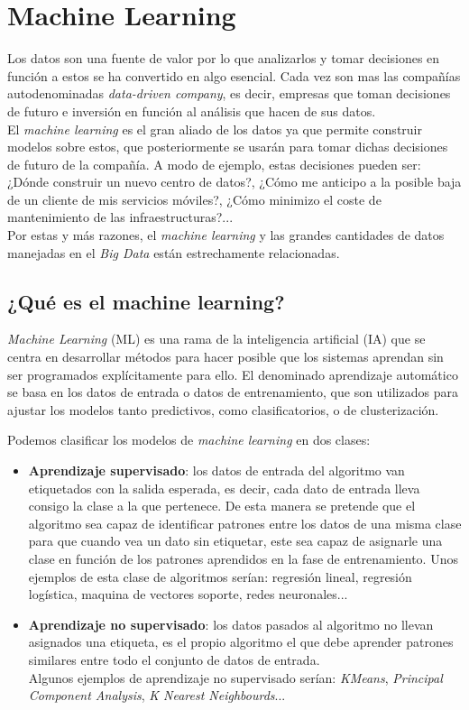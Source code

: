 \chapter{Machine Learning}
Los datos son una fuente de valor por lo que analizarlos y tomar decisiones en función a estos se ha
convertido en algo esencial. Cada vez son mas las compañías autodenominadas 
\textit{data-driven company}, es decir, empresas que toman decisiones de 
futuro e inversión en función al análisis que hacen de sus datos.\\
El \textit{machine learning} es el gran aliado de los datos ya que permite construir modelos sobre estos,
que posteriormente se usarán para tomar dichas decisiones de futuro de la compañía. A modo de ejemplo, estas
decisiones pueden ser: ¿Dónde construir un nuevo centro de datos?, ¿Cómo me anticipo a la posible baja de un
cliente de mis servicios móviles?, ¿Cómo minimizo el coste de mantenimiento de las infraestructuras?...\\
Por estas y más razones, el \textit{machine learning} y las grandes cantidades de datos manejadas en el 
\textit{Big Data} están estrechamente relacionadas.

\section{¿Qué es el machine learning?}
\textit{Machine Learning} (ML) es una rama de la inteligencia artificial (IA) 
que se centra en desarrollar métodos para hacer posible que los sistemas aprendan sin ser programados 
explícitamente para ello.
El denominado aprendizaje automático se basa en los datos de entrada o datos de entrenamiento, que
son utilizados para ajustar los modelos tanto predictivos, como clasificatorios, o de clusterización.

Podemos clasificar los modelos de \textit{machine learning} en dos clases:
\begin{itemize}
  \item \textbf{Aprendizaje supervisado}: los datos de entrada del 
  algoritmo van etiquetados con la salida esperada, es decir, cada dato de entrada lleva consigo 
  la clase a la que pertenece. De esta manera se pretende que el algoritmo sea capaz de identificar 
  patrones entre los datos de una misma clase para que cuando vea un dato sin etiquetar, este sea 
  capaz de asignarle una clase en función de los patrones aprendidos en la fase de entrenamiento.
  Unos ejemplos de esta clase de algoritmos serían: regresión lineal, regresión logística, 
  maquina de vectores soporte, redes neuronales...
  
  \item \textbf{Aprendizaje no supervisado}: los datos pasados 
  al algoritmo no llevan asignados una etiqueta, es el propio algoritmo el que debe aprender 
  patrones similares entre todo el conjunto de datos de entrada.\\
  Algunos ejemplos de aprendizaje no supervisado serían: \textit{KMeans}, \textit{Principal Component Analysis}, 
  \textit{K Nearest Neighbourds}...
\end{itemize}

